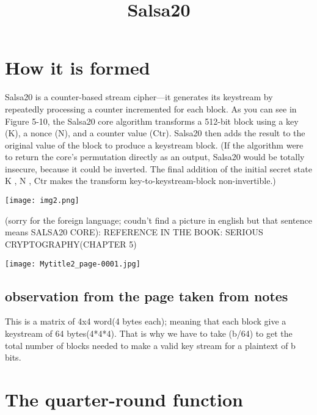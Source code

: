\documentclass{article}
\title{Salsa20}
\begin{document}

\maketitle                   %



\section{How it is formed}

 



Salsa20 is a counter-based stream cipher—it generates its keystream by
repeatedly processing a counter incremented for each block. As you can
see in Figure 5-10, the Salsa20 core algorithm transforms a 512-bit block
using a key (K), a nonce (N), and a counter value (Ctr). Salsa20 then adds
the result to the original value of the block to produce a keystream block.
(If the algorithm were to return the core’s permutation directly as an
output, Salsa20 would be totally insecure, because it could be inverted.
The final addition of the initial secret state K , N , Ctr makes the
transform key-to-keystream-block non-invertible.)




\texttt{[image: img2.png]}

(sorry for the foreign language; coudn't find a picture in english but that 
sentence means SALSA20 CORE): REFERENCE IN THE BOOK: SERIOUS CRYPTOGRAPHY(CHAPTER 5) 



\texttt{[image: Mytitle2\_page-0001.jpg]}



\subsection{observation from the page taken from notes}


This is a matrix of 4x4 word(4 bytes each);
meaning that each block give a keystream of 64 bytes(4*4*4).
That is why we have to take (b/64) to get the total number of blocks needed to
make a valid key stream for a plaintext of b bits.




\section{The quarter-round function}
\end{document}
